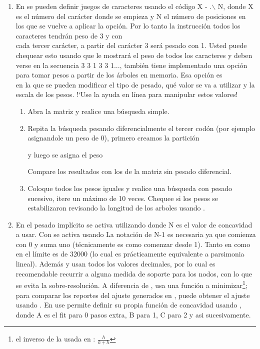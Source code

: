 \begin{enumerate}
	\item En 
	se pueden definir juegos de caracteres usando el c\'odigo X - .$\backslash$ N, donde X es el n\'umero del car\'acter donde se empieza y N el n\'umero de posiciones en los que se vuelve a aplicar la opci\'on. Por lo tanto la instrucci\'on  todos los caracteres tendr\'an peso de 3 y con \\ cada tercer car\'acter, a partir del car\'acter 3 ser\'a pesado con 1. Usted puede chequear esto usando  que le mostrar\'a el peso de todos los caracteres y deben verse en la secuencia 3 3 1 3 3 1...,
	tambi\'en tiene implementado una opci\'on para tomar pesos a partir de los \'arboles en memoria. Esa opci\'on es \\en la que se pueden modificar el tipo de pesado, qu\'e valor se va a utilizar y la escala de los pesos. !`Use la ayuda en l\'inea para manipular estos valores!
	\begin{enumerate}
		\item Abra la matriz y realice una b\'usqueda simple.
		\item Repita la b\'usqueda pesando diferencialmente el tercer cod\'on (por ejemplo asignandole un peso de 0), primero creamos la partici\'on

		y luego se asigna el peso 

		Compare los resultados con los de la matriz sin pesado diferencial.

		\item Coloque todos los pesos iguales y realice una b\'usqueda con pesado sucesivo, itere un m\'aximo de 10 veces. Chequee si los pesos se estabilizaron revisando la longitud de los arboles usando .
	\end{enumerate}
	
	\item En  el pesado impl\'icito se activa utilizando  donde N es el valor de concavidad a usar. Con  se activa usando  La notaci\'on de N-1 es necesaria ya que  comienza con 0 y suma uno (t\'ecnicamente es como comenzar desde 1). Tanto en  como en  el l\'imite es de 32000 (lo cual es pr\'acticamente equivalente a parsimonia lineal). Adem\'as  y  usan todos los valores decimales, por lo cual es recomendable recurrir a alguna medida de soporte para los nodos, con lo que se evita la sobre-resoluci\'on. A diferencia de ,  usa una funci\'on a minimizar\footnote{el inverso de la usada en : $\frac{h}{k + h}$}; para comparar los reportes del ajuste generados en , puede obtener el ajuste usando .  En   use 
	 permite definir su propia funci\'on de concavidad usando \Cmd{piwe [A B C...;}, donde A es el fit para 0 pasos extra, B para 1, C para 2 y asi sucesivamente. 


\end{enumerate}
